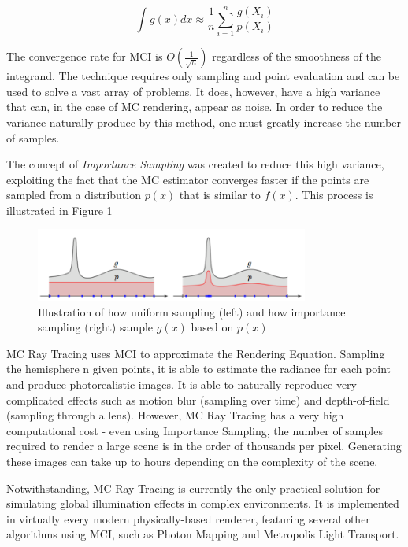 $$ \int g(x)dx \approx \frac{1}{n} \sum_{i = 1}^{n} \frac{g(X_i)}{p(X_i)}$$

The convergence rate for MCI is $O(\frac{1}{\sqrt{n}})$ regardless of the smoothness of the integrand. The technique requires only sampling and point evaluation and can be used to solve a vast array of problems. It does, however, have a high variance that can, in the case of MC rendering, appear as noise. In order to reduce the variance naturally produce by this method, one must greatly increase the number of samples.

The concept of \textit{Importance Sampling} was created to reduce this high variance, exploiting the fact that the MC estimator converges faster if the points are sampled from a distribution $p(x)$ that is similar to $f(x)$. This process is illustrated in Figure \ref{fig:importance}

\begin{figure}[h]
  \centering
  \includegraphics[width=0.8\textwidth,height=\textheight,keepaspectratio]{images/3_theoretical_foundations/importance.png}
  \caption{Illustration of how uniform sampling (left) and how importance sampling (right) sample $g(x)$ based on $p(x)$}
  \label{fig:importance}
\end{figure}


MC Ray Tracing uses MCI to approximate the Rendering Equation. Sampling the hemisphere n given points, it is able to estimate the radiance for each point and produce photorealistic images. It is able to naturally reproduce very complicated effects such as motion blur (sampling over time) and depth-of-field (sampling through a lens). However, MC Ray Tracing has a very high computational cost - even using Importance Sampling, the number of samples required to render a large scene is in the order of thousands per pixel. Generating these images can take up to hours depending on the complexity of the scene. 

Notwithstanding, MC Ray Tracing is currently the only practical solution for simulating global illumination effects in complex environments. It is implemented in virtually every modern physically-based renderer, featuring several other algorithms using MCI, such as Photon Mapping and Metropolis Light Transport.